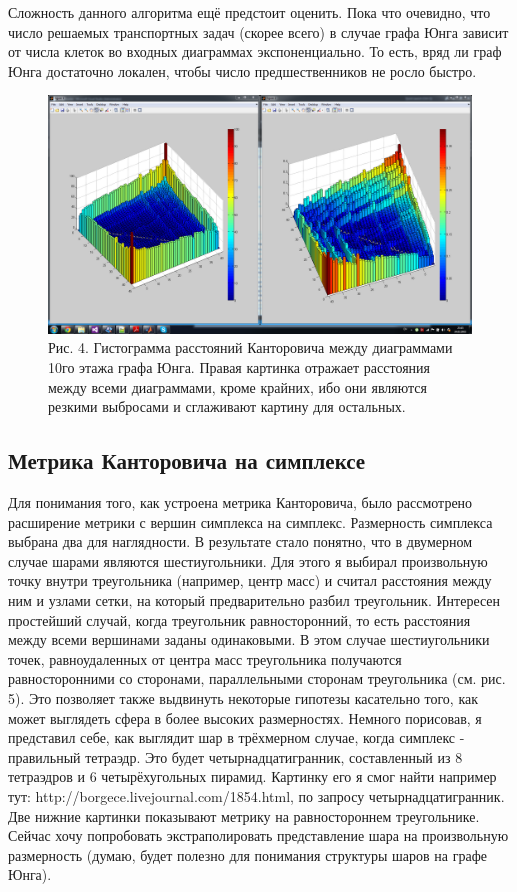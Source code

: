 \documentclass[12pt]{report}
\begin{document}
Сложность данного алгоритма ещё предстоит оценить. Пока что очевидно, что число решаемых транспортных задач (скорее всего) в случае графа Юнга зависит от числа клеток во входных диаграммах экспоненциально. То есть, вряд ли граф Юнга достаточно локален, чтобы число предшественников не росло быстро. 

\begin{figure}[!ht]
\begin{center}
\includegraphics[scale=0.3]{metric}
\\Рис. 4. Гистограмма расстояний Канторовича между диаграммами 10го этажа графа Юнга. Правая картинка отражает расстояния между всеми диаграммами, кроме крайних, ибо они являются резкими выбросами и сглаживают картину для остальных.
\end{center}
\end{figure}

\subsection*{Метрика Канторовича на симплексе}

\hspace{\parindent} Для понимания того, как устроена метрика Канторовича, было рассмотрено расширение метрики с вершин симплекса на симплекс. Размерность симплекса выбрана два для наглядности. В результате стало понятно, что в двумерном случае шарами являются шестиугольники. Для этого я выбирал произвольную точку внутри треугольника (например, центр масс) и считал расстояния между ним и узлами сетки, на который предварительно разбил треугольник. Интересен простейший случай, когда треугольник равносторонний, то есть расстояния между всеми вершинами заданы одинаковыми. В этом случае шестиугольники точек, равноудаленных от центра масс треугольника получаются равносторонними со сторонами, параллельными сторонам треугольника (см. рис. 5). Это позволяет также выдвинуть некоторые гипотезы касательно того, как может выглядеть сфера в более высоких размерностях. Немного порисовав, я представил себе, как выглядит шар в трёхмерном случае, когда симплекс - правильный тетраэдр. Это будет четырнадцатигранник, составленный из 8 тетраэдров и 6 четырёхугольных пирамид. Картинку его я смог найти например тут: http://borgece.livejournal.com/1854.html, по запросу четырнадцатигранник. Две нижние картинки показывают метрику на равностороннем треугольнике.
Сейчас хочу попробовать экстраполировать представление шара на произвольную размерность (думаю, будет полезно для понимания структуры  шаров на графе Юнга).
\end{document}
